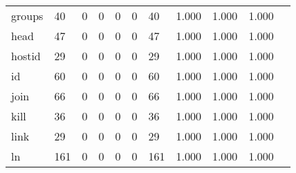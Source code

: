 \begin{longtable}{lp{1.10cm}p{1.10cm}p{1.10cm}p{1.10cm}p{1.10cm}p{1.10cm}p{1.10cm}p{1.10cm}p{1.10cm}p{1.10cm}}
groups    &                     40 &                                  0 &                                 0 &                                0 &                                 0 &                              40 &                          1.000 &                                 1.000 &                               1.000 \\
head      &                     47 &                                  0 &                                 0 &                                0 &                                 0 &                              47 &                          1.000 &                                 1.000 &                               1.000 \\
hostid    &                     29 &                                  0 &                                 0 &                                0 &                                 0 &                              29 &                          1.000 &                                 1.000 &                               1.000 \\
id        &                     60 &                                  0 &                                 0 &                                0 &                                 0 &                              60 &                          1.000 &                                 1.000 &                               1.000 \\
join      &                     66 &                                  0 &                                 0 &                                0 &                                 0 &                              66 &                          1.000 &                                 1.000 &                               1.000 \\
kill      &                     36 &                                  0 &                                 0 &                                0 &                                 0 &                              36 &                          1.000 &                                 1.000 &                               1.000 \\
link      &                     29 &                                  0 &                                 0 &                                0 &                                 0 &                              29 &                          1.000 &                                 1.000 &                               1.000 \\
ln        &                    161 &                                  0 &                                 0 &                                0 &                                 0 &                             161 &                          1.000 &                                 1.000 &                               1.000 \\

\end{longtable}
